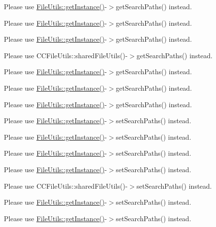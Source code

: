 \begin{DoxyRefList}
Please use \hyperlink{classFileUtils_ac8ced4394d59f5459445ced27ccd0e8a}{File\+Utils\+::get\+Instance()}-\/$>$get\+Search\+Paths() instead. 

Please use \hyperlink{classFileUtils_ac8ced4394d59f5459445ced27ccd0e8a}{File\+Utils\+::get\+Instance()}-\/$>$get\+Search\+Paths() instead. 

Please use \hyperlink{classFileUtils_ac8ced4394d59f5459445ced27ccd0e8a}{File\+Utils\+::get\+Instance()}-\/$>$get\+Search\+Paths() instead. 

Please use C\+C\+File\+Utils\+::shared\+File\+Utils()-\/$>$get\+Search\+Paths() instead. 

Please use \hyperlink{classFileUtils_ac8ced4394d59f5459445ced27ccd0e8a}{File\+Utils\+::get\+Instance()}-\/$>$get\+Search\+Paths() instead. 

Please use \hyperlink{classFileUtils_ac8ced4394d59f5459445ced27ccd0e8a}{File\+Utils\+::get\+Instance()}-\/$>$get\+Search\+Paths() instead. 

Please use \hyperlink{classFileUtils_ac8ced4394d59f5459445ced27ccd0e8a}{File\+Utils\+::get\+Instance()}-\/$>$get\+Search\+Paths() instead.  
\item[\label{deprecated__deprecated000120}%
\Hypertarget{deprecated__deprecated000120}%
Member \hyperlink{classApplication_a011ba0e9ba624c1e2efc36ad38f4d0b5}{Application\+:\+:set\+Resource\+Root\+Path} (const std\+::string \&root\+Res\+Dir)]Please use \hyperlink{classFileUtils_ac8ced4394d59f5459445ced27ccd0e8a}{File\+Utils\+::get\+Instance()}-\/$>$set\+Search\+Paths() instead. 

Please use \hyperlink{classFileUtils_ac8ced4394d59f5459445ced27ccd0e8a}{File\+Utils\+::get\+Instance()}-\/$>$set\+Search\+Paths() instead. 

Please use \hyperlink{classFileUtils_ac8ced4394d59f5459445ced27ccd0e8a}{File\+Utils\+::get\+Instance()}-\/$>$set\+Search\+Paths() instead. 

Please use \hyperlink{classFileUtils_ac8ced4394d59f5459445ced27ccd0e8a}{File\+Utils\+::get\+Instance()}-\/$>$set\+Search\+Paths() instead. 

Please use C\+C\+File\+Utils\+::shared\+File\+Utils()-\/$>$set\+Search\+Paths() instead. 

Please use \hyperlink{classFileUtils_ac8ced4394d59f5459445ced27ccd0e8a}{File\+Utils\+::get\+Instance()}-\/$>$set\+Search\+Paths() instead. 

Please use \hyperlink{classFileUtils_ac8ced4394d59f5459445ced27ccd0e8a}{File\+Utils\+::get\+Instance()}-\/$>$set\+Search\+Paths() instead. 


\end{DoxyRefList}
